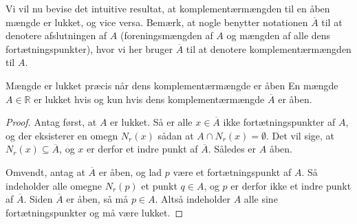 Vi vil nu bevise det intuitive resultat, at komplementærmængden til en åben mængde er lukket, og vice versa.
Bemærk, at nogle benytter notationen $\overline A$ til at denotere afslutningen af $A$ (foreningsmængden af $A$ og mængden af alle dens fortætningspunkter), hvor vi her bruger $\overline A$ til at denotere komplementærmængden til $A$.

\begin{theorem}[label=theo:åben_lukket_komp]{Mængde er lukket præcis når dens komplementærmængde er åben}{}
  En mængde $A \in \mathbb{R}$ er lukket hvis og kun hvis dens komplementærmængde $\overline A$ er åben. 
\end{theorem}
\begin{proof} 
  Antag først, at $A$ er lukket.
  Så er alle $x \in \overline A$ ikke fortætningspunkter af $A$, og der eksisterer en omegn $N_r(x)$ sådan at $A \cap N_r(x)=\emptyset$. 
  Det vil sige, at $N_r(x) \subseteq \overline A$, og $x$ er derfor et indre punkt af $\overline A$.
  Således er $A$ åben. 

  Omvendt, antag at $\overline A$ er åben, og lad $p$ være et fortætningspunkt af $A$. 
  Så indeholder alle omegne $N_r(p)$ et punkt $q \in A$, og $p$ er derfor ikke et indre punkt af $\overline A$.
  Siden $\overline A$ er åben, så må $p \in A$.
  Altså indeholder $A$ alle sine fortætningspunkter og må være lukket. 
\end{proof}

